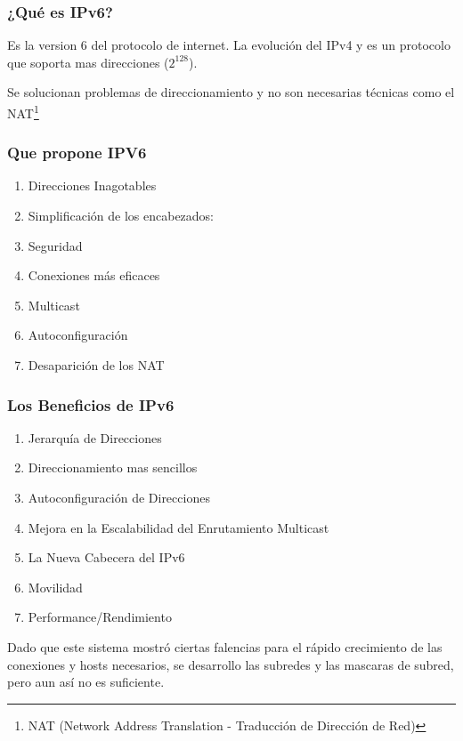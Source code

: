 \documentclass{beamer}
\begin{document}
\begin{frame}
\frametitle{¿Qué es IPv6?}

Es la version 6 del protocolo de internet. La evolución del IPv4 y es un protocolo que soporta mas direcciones ($2^{128}$).\vspace{0.3cm}
\par Se solucionan problemas de direccionamiento y no son necesarias técnicas como el NAT\footnote{NAT (Network Address Translation - Traducción de Dirección de Red)}
\end{frame}

\begin{frame}
\frametitle{Que propone IPV6}

\begin{enumerate}[$*$]
	
 	\item Direcciones Inagotables
	\item Simplificación de los encabezados:
	\item Seguridad
	\item Conexiones más eficaces
	\item Multicast
	\item Autoconfiguración
	\item Desaparición de los NAT
\end{enumerate}
\end{frame}
\begin{frame}
\frametitle{Los Beneficios de IPv6}

\begin{enumerate}[$*$]
	
 \item Jerarquía de Direcciones
\item Direccionamiento mas sencillos
\item Autoconfiguración de Direcciones
\item Mejora en la Escalabilidad del Enrutamiento Multicast
\item La Nueva Cabecera del IPv6
\item Movilidad
\item Performance/Rendimiento



\end{enumerate}
Dado que este sistema mostró ciertas falencias para el rápido crecimiento de las conexiones y hosts
necesarios, se desarrollo las subredes y las mascaras de subred, pero aun así no es suficiente.

\end{frame}
\end{document}
